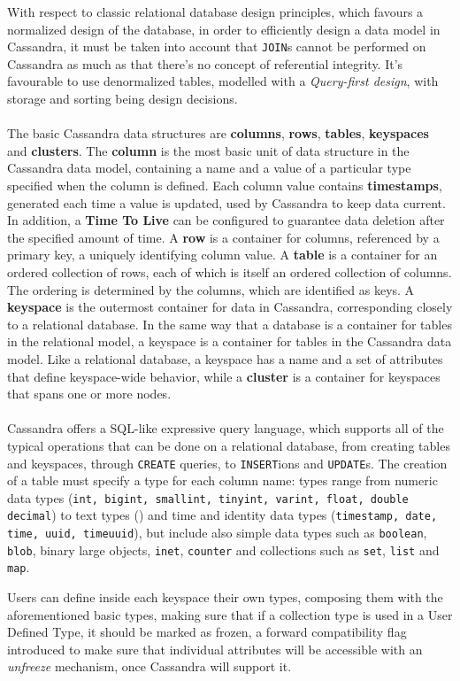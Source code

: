 With respect to classic relational database design principles, which favours a normalized design of the database, in order to efficiently design a data model in Cassandra, it must be taken into account that \texttt{JOIN}s cannot be performed on Cassandra as much as that there's no concept of referential integrity. It's favourable to use denormalized tables, modelled with a \textit{Query-first design}, with storage and sorting being design decisions.\\
\\
The basic Cassandra data structures are \textbf{columns}, \textbf{rows}, \textbf{tables}, \textbf{keyspaces} and \textbf{clusters}. The \textbf{column} is the most basic unit of data structure in the Cassandra data model, containing a name and a value of a particular type specified when the column is defined. Each column value contains \textbf{timestamps}, generated each time a value is updated, used by Cassandra to keep data current. In addition, a \textbf{Time To Live} can be configured to guarantee data deletion after the specified amount of time. A \textbf{row} is a container for columns, referenced by a primary key, a uniquely identifying column value. A \textbf{table} is a container for an ordered collection of rows, each of which is itself an ordered collection of columns. The ordering is determined by the columns, which are identified as keys. A \textbf{keyspace} is the outermost container for data in Cassandra, corresponding closely to a relational database. In the same way that a database is a container for tables in the relational model, a keyspace is a container for tables in the Cassandra data model. Like a relational database, a keyspace has a name and a set of attributes that define keyspace-wide behavior, while a \textbf{cluster} is a container for keyspaces that spans one or more nodes.\\
\\
Cassandra offers a SQL-like expressive query language, which supports all of the typical operations that can be done on a relational database, from creating tables and keyspaces, through \texttt{CREATE} queries, to \texttt{INSERT}ions and \texttt{UPDATE}s. The creation of a table must specify a type for each column name: types range from numeric data types (\texttt{int, bigint, smallint, tinyint, varint, float, double decimal}) to text types (\texttt{}) and time and identity data types (\texttt{timestamp, date, time, uuid, timeuuid}), but include also simple data types such as \texttt{boolean}, \texttt{blob}, binary large objects, \texttt{inet}, \texttt{counter} and collections such as \texttt{set}, \texttt{list} and \texttt{map}.

Users can define inside each keyspace their own types, composing them with the aforementioned basic types, making sure that if a collection type is used in a User Defined Type, it should be marked as frozen, a forward compatibility flag introduced to make sure that individual attributes will be accessible with an \textit{unfreeze} mechanism, once Cassandra will support it.